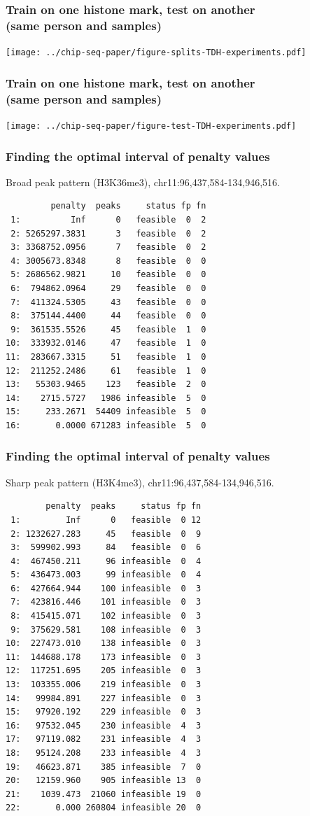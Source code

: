 \documentclass{beamer}
\begin{document}
\begin{frame}
  \frametitle{Train on one histone mark, test on another\\
(same person and samples)}
  \texttt{[image: ../chip-seq-paper/figure-splits-TDH-experiments.pdf]}
\end{frame}

\begin{frame}
  \frametitle{Train on one histone mark, test on another\\
(same person and samples)}
  \texttt{[image: ../chip-seq-paper/figure-test-TDH-experiments.pdf]}
\end{frame}

\begin{frame}[fragile]
  \frametitle{Finding the optimal interval of penalty values}
\vskip 0.2cm Broad peak pattern (H3K36me3), chr11:96,437,584-134,946,516.
\scriptsize
\begin{verbatim}
         penalty  peaks     status fp fn
 1:          Inf      0   feasible  0  2
 2: 5265297.3831      3   feasible  0  2
 3: 3368752.0956      7   feasible  0  2
 4: 3005673.8348      8   feasible  0  0
 5: 2686562.9821     10   feasible  0  0
 6:  794862.0964     29   feasible  0  0
 7:  411324.5305     43   feasible  0  0
 8:  375144.4400     44   feasible  0  0
 9:  361535.5526     45   feasible  1  0
10:  333932.0146     47   feasible  1  0
11:  283667.3315     51   feasible  1  0
12:  211252.2486     61   feasible  1  0
13:   55303.9465    123   feasible  2  0
14:    2715.5727   1986 infeasible  5  0
15:     233.2671  54409 infeasible  5  0
16:       0.0000 671283 infeasible  5  0
\end{verbatim}
\end{frame}

\begin{frame}[fragile]
  \frametitle{Finding the optimal interval of penalty values}
\vskip 0.2cm Sharp peak pattern (H3K4me3), chr11:96,437,584-134,946,516.
\scriptsize
\begin{verbatim}
        penalty  peaks     status fp fn
 1:         Inf      0   feasible  0 12
 2: 1232627.283     45   feasible  0  9
 3:  599902.993     84   feasible  0  6
 4:  467450.211     96 infeasible  0  4
 5:  436473.003     99 infeasible  0  4
 6:  427664.944    100 infeasible  0  3
 7:  423816.446    101 infeasible  0  3
 8:  415415.071    102 infeasible  0  3
 9:  375629.581    108 infeasible  0  3
10:  227473.010    138 infeasible  0  3
11:  144688.178    173 infeasible  0  3
12:  117251.695    205 infeasible  0  3
13:  103355.006    219 infeasible  0  3
14:   99984.891    227 infeasible  0  3
15:   97920.192    229 infeasible  0  3
16:   97532.045    230 infeasible  4  3
17:   97119.082    231 infeasible  4  3
18:   95124.208    233 infeasible  4  3
19:   46623.871    385 infeasible  7  0
20:   12159.960    905 infeasible 13  0
21:    1039.473  21060 infeasible 19  0
22:       0.000 260804 infeasible 20  0
\end{verbatim}
\end{frame}
\end{document}
